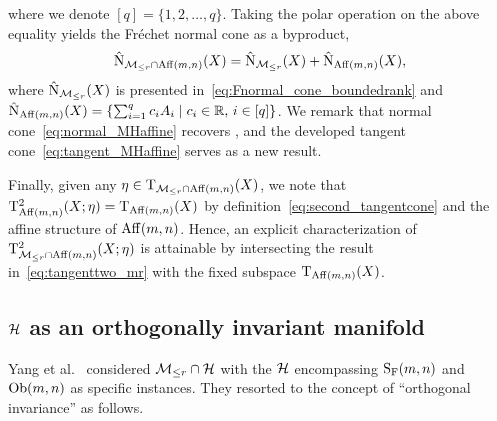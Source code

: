 where we denote $[q]=\{1,2,\ldots,q\}$. Taking the polar operation on the above equality yields the Fr\'echet normal cone as a byproduct,
\begin{equation}\label{eq:normal_MHaffine}
    \hat{\mathrm{N}}_{\mathcal{M}_{\le r}\cap\mathrm{Aff}(m,n)}(X) = \hat{\mathrm{N}}_{\mathcal{M}_{\le r}}(X) + \hat{\mathrm{N}}_{\mathrm{Aff}(m,n)}(X),
\end{equation}
where $\hat{\mathrm{N}}_{\mathcal{M}_{\le r}}(X)$ is presented in~\eqref{eq:Fnormal_cone_boundedrank} and $\hat{\mathrm{N}}_{\mathrm{Aff}(m,n)}(X)=\{\sum_{i=1}^q c_iA_i\mid c_i\in\mathbb{R},\,i\in[q]\}$. We remark that normal cone~\eqref{eq:normal_MHaffine} recovers \cite[Theorem 3.7]{li2023normalboundedaffine}, and the developed tangent cone~\eqref{eq:tangent_MHaffine} serves as a new result.

Finally, given any $\eta\in\mathrm{T}_{\mathcal{M}_{\le r}\cap\mathrm{Aff}(m,n)}(X)$, we note that $\mathrm{T}^2_{\mathrm{Aff}(m,n)}(X;\eta)=\mathrm{T}_{\mathrm{Aff}(m,n)}(X) $ by definition~\eqref{eq:second_tangentcone} and the affine structure of $\mathrm{Aff}(m,n)$. Hence, an explicit characterization of $\mathrm{T}^2_{\mathcal{M}_{\le r}\cap\mathrm{Aff}(m,n)}(X;\eta)$ is attainable by intersecting the result in~\eqref{eq:tangenttwo_mr} with the fixed subspace $\mathrm{T}_{\mathrm{Aff}(m,n)}(X)$.



\subsection{$\mathcal{H}$ as an orthogonally invariant manifold}\label{app:Horthogonalinvariant}

Yang et al.~\cite{yang2025spacedecouple} considered $\mathcal{M}_{\le r}\cap\mathcal{H}$ with the $\mathcal{H}$ encompassing $\mathrm{S_F}(m,n)$ and $\mathrm{Ob}(m,n)$ as specific instances. They resorted to the concept of ``orthogonal invariance'' as follows.

